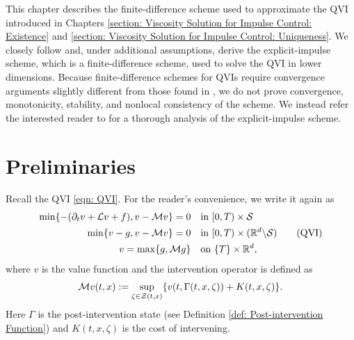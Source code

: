 \label{section: Numerical solution of the QVI}
This chapter describes the finite-difference scheme used to approximate the QVI introduced in Chapters \ref{section: Viscosity Solution for Impulse Control: Existence} and \ref{section: Viscosity Solution for Impulse Control: Uniqueness}. We closely follow \cite{azimzadeh2018impulsecontrolfinancenumerical} and, under additional assumptions, derive the explicit-impulse scheme, which is a finite-difference scheme, used to solve the QVI in lower dimensions. Because finite-difference schemes for QVIs require convergence arguments slightly different from those found in \textcite{barlessouganidis1991convergence}, we do not prove convergence, monotonicity, stability, and nonlocal consistency of the scheme. We instead refer the interested reader to \cite{azimzadeh2018impulsecontrolfinancenumerical, azimzadeh2018convergence, azimzadeh2016weakly} for a thorough  analysis of the explicit-impulse scheme.


\section{Preliminaries}
\label{section: Preliminaries (Ch.6)}
Recall the QVI \eqref{eqn: QVI}. For the reader's convenience, we write it again as 
\begin{align}
    \min \{-(\partial_t v + \mathcal{L} v + f), v - \mathcal{M} v \} = 0 & \quad \text{in } [0,T) \times \mathcal{S} \nonumber \\
    \min \{v-g, v - \mathcal{M} v \} = 0 & \quad \text{in } [0,T) \times (\mathbb{R}^d \backslash \mathcal{S} ) \tag{QVI} \label{eqn: QVI (Ch.6)} \\
    v = \max \{g, \mathcal{M} g\} & \quad \text{on } \{T\} \times \mathbb{R}^d \nonumber,
\end{align}
where $v$ is the value function and the intervention operator is defined as 
\begin{equation*}
    \mathcal{M} v(t,x) := \sup_{\substack{\zeta \in \mathcal{Z}(t,x)}} \{v(t,\Gamma(t,x,\zeta)) + K(t,x,\zeta)\}.
\end{equation*}
Here $\Gamma$ is the post-intervention state (see Definition \ref{def: Post-intervention Function}) and $K(t,x,\zeta)$ is the cost of intervening. 

